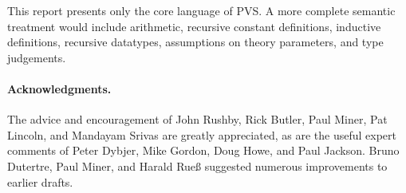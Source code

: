 \documentclass [12pt,twoside]{cslreport}
\begin{document}
This report presents only the core language of PVS.  A more complete
semantic treatment would include arithmetic, recursive constant
definitions, inductive definitions, recursive datatypes, assumptions on
theory parameters, and type judgements.

\paragraph{Acknowledgments. } The advice and encouragement of John Rushby,
Rick Butler, Paul Miner, Pat Lincoln, and Mandayam Srivas are greatly
appreciated, as are the useful expert comments of Peter Dybjer, Mike
Gordon, Doug Howe, and Paul Jackson.  Bruno Dutertre, Paul Miner, and
Harald Rue{\ss} suggested numerous improvements to earlier drafts.

\begin{comment}
What is a specification language?  A programming language is meant to
express an algorithm in such a way that it can be executed on a computing
machine.  For example, a program implementing a sorting algorithm such as
quicksort can be written in a programming language like C.  Such a program
is a recipe for computing the desired outcome but does not directly
describe this outcome.  In the case of a sorting program, the desired
result is that 
the output array must be an ordered permutation of the input array.
A specification language is the medium for expressing and establishing
such properties of programs.  A specification language could itself be a
programming language but non-executable features such as quantifiers and
temporal operators  add to the expressiveness of a specification language.
%
Specification languages need to capture mathematics
as well as programming.  The use of an expressive type system lends
considerable mathematical clarity to a specification.  
ProVeS is an environment for
specification  and verification based on a typed higher-order logic.
The type system of ProVeS includes
{\em predicate subtypes}, i.e.,
the type consisting of elements of a given type satisfying a specified
predicate, in addition to the usual constructs for
function, product, record, and array types.  Automated theorem proving
procedures are employed in the process of typechecking.
The design and rules
for the type system and logic of ProVeS are presented along
with arguments for their soundness.
\end{abstract}
%





%

\end{comment}
\end{document}
